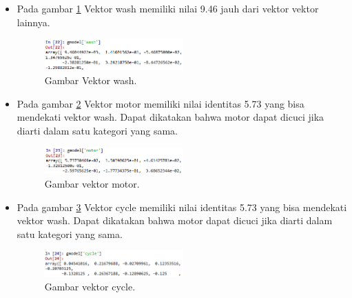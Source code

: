 \begin{enumerate}
\begin{itemize}
\item Pada gambar \ref{9wash} Vektor wash memiliki nilai 9.46 jauh dari vektor vektor lainnya.
	\begin{figure}[ht]
	\centerline{\includegraphics[width=0.5\textwidth]{figures/chapter5/9wash.png}}
	\caption{Gambar Vektor wash.}	
	\label{9wash}
	\end{figure}


\item Pada gambar \ref{10motor} Vektor motor memiliki nilai identitas 5.73 yang bisa mendekati vektor wash. Dapat dikatakan bahwa motor dapat dicuci jika diarti dalam satu kategori yang sama.
	\begin{figure}[ht]
	\centerline{\includegraphics[width=0.5\textwidth]{figures/chapter5/10motor.png}}
	\caption{Gambar vektor motor.}	
	\label{10motor}
	\end{figure}

\item Pada gambar \ref{11cycle} Vektor cycle memiliki nilai identitas 5.73 yang bisa mendekati vektor wash. Dapat dikatakan bahwa motor dapat dicuci jika diarti dalam satu kategori yang sama.
	\begin{figure}[ht]
	\centerline{\includegraphics[width=0.5\textwidth]{figures/chapter5/11cycle.png}}
	\caption{Gambar vektor cycle.}	
	\label{11cycle}
	\end{figure}
\end{itemize}


\end{enumerate}
